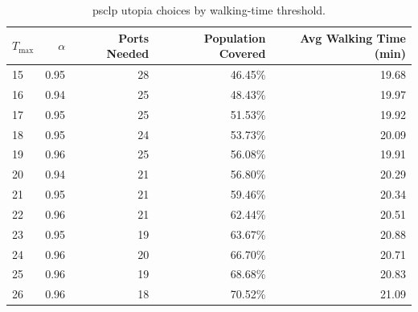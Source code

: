 \documentclass[12pt]{article}
\begin{document}
\begin{table}[htbp]
  \centering
  \caption{\ac{psclp} utopia choices by walking-time threshold.}
  \label{anx:psclp_runs_details}

  \begin{tabular}{lrrrr}
    \toprule
    \textbf{\(T_{\max}\)} & \textbf{\(\alpha\)} & \textbf{Ports Needed} & \textbf{Population Covered} & \textbf{Avg Walking Time (min)} \\
    \midrule
    15                    & 0.95                & 28                    & 46.45\%                     & 19.68                           \\
    16                    & 0.94                & 25                    & 48.43\%                     & 19.97                           \\
    17                    & 0.95                & 25                    & 51.53\%                     & 19.92                           \\
    18                    & 0.95                & 24                    & 53.73\%                     & 20.09                           \\
    19                    & 0.96                & 25                    & 56.08\%                     & 19.91                           \\
    20                    & 0.94                & 21                    & 56.80\%                     & 20.29                           \\
    21                    & 0.95                & 21                    & 59.46\%                     & 20.34                           \\
    22                    & 0.96                & 21                    & 62.44\%                     & 20.51                           \\
    23                    & 0.95                & 19                    & 63.67\%                     & 20.88                           \\
    24                    & 0.96                & 20                    & 66.70\%                     & 20.71                           \\
    25                    & 0.96                & 19                    & 68.68\%                     & 20.83                           \\
    26                    & 0.96                & 18                    & 70.52\%                     & 21.09                           \\

\end{tabular}
\end{table}
\end{document}
